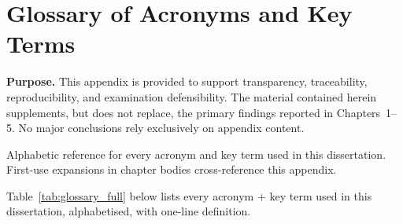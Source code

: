 \chapter{Glossary of Acronyms and Key Terms}


\noindent\textbf{Purpose.} This appendix is provided to support transparency, traceability, reproducibility, and examination defensibility. The material contained herein supplements, but does not replace, the primary findings reported in Chapters~1--5. No major conclusions rely exclusively on appendix content.

\label{chap:appendix_s_glossary}

\noindent Alphabetic reference for every acronym and key term used in this dissertation. First-use expansions in chapter bodies cross-reference this appendix.

\noindent Table~\ref{tab:glossary_full} below lists every acronym + key term used in this dissertation, alphabetised, with one-line definition.

